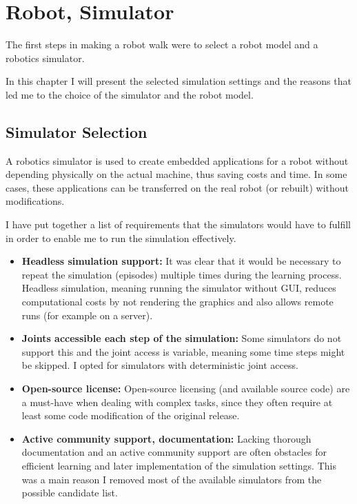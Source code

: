 

\chapter{Robot, Simulator}
\label{chapter:robsim}

The first steps in making a robot walk were to select a robot model and a robotics simulator.

In this chapter I will present the selected simulation settings and the reasons that led me to the choice of the simulator and the robot model. 

\section{Simulator Selection}
A robotics simulator is used to create embedded applications for a robot without depending physically on the actual machine, thus saving costs and time. In some cases, these applications can be transferred on the real robot (or rebuilt) without modifications. 

\medskip

I have put together a list of requirements that the simulators would have to fulfill in order to enable me to run the simulation effectively.
\begin{itemize}
\item \textbf{Headless simulation support:} It was clear that it would be necessary to repeat the simulation (episodes) multiple times during the learning process. Headless simulation, meaning running the simulator without GUI, reduces computational costs by not rendering the graphics and also allows remote runs (for example on a server).

\item \textbf{Joints accessible each step of the simulation:} Some simulators do not support this and the joint access is variable, meaning some time steps might be skipped. I opted for simulators with deterministic joint access.

\item \textbf{Open-source license:} Open-source licensing (and available source code) are a must-have when dealing with complex tasks, since they often require at least some code modification of the original release.

\item \textbf{Active community support, documentation:} Lacking thorough documentation and an active community support are often  obstacles for efficient learning and later implementation of the simulation settings. This was a main reason I removed most of the available simulators from the possible candidate list.

\end{itemize}

